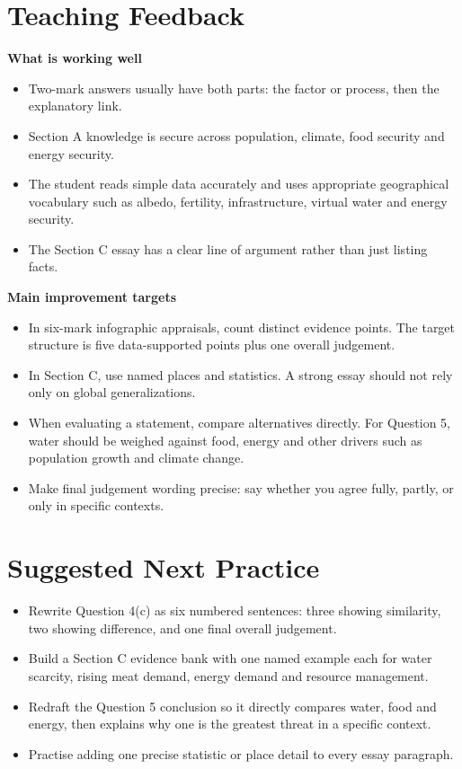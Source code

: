 \documentclass[11pt]{article}
\begin{document}
\section*{Teaching Feedback}

\textbf{What is working well}
\begin{itemize}
  \item Two-mark answers usually have both parts: the factor or process, then the explanatory link.
  \item Section A knowledge is secure across population, climate, food security and energy security.
  \item The student reads simple data accurately and uses appropriate geographical vocabulary such as albedo, fertility, infrastructure, virtual water and energy security.
  \item The Section C essay has a clear line of argument rather than just listing facts.
\end{itemize}

\textbf{Main improvement targets}
\begin{itemize}
  \item In six-mark infographic appraisals, count distinct evidence points. The target structure is five data-supported points plus one overall judgement.
  \item In Section C, use named places and statistics. A strong essay should not rely only on global generalizations.
  \item When evaluating a statement, compare alternatives directly. For Question 5, water should be weighed against food, energy and other drivers such as population growth and climate change.
  \item Make final judgement wording precise: say whether you agree fully, partly, or only in specific contexts.
\end{itemize}

\section*{Suggested Next Practice}

\begin{itemize}
  \item Rewrite Question 4(c) as six numbered sentences: three showing similarity, two showing difference, and one final overall judgement.
  \item Build a Section C evidence bank with one named example each for water scarcity, rising meat demand, energy demand and resource management.
  \item Redraft the Question 5 conclusion so it directly compares water, food and energy, then explains why one is the greatest threat in a specific context.
  \item Practise adding one precise statistic or place detail to every essay paragraph.
\end{itemize}
\end{document}
